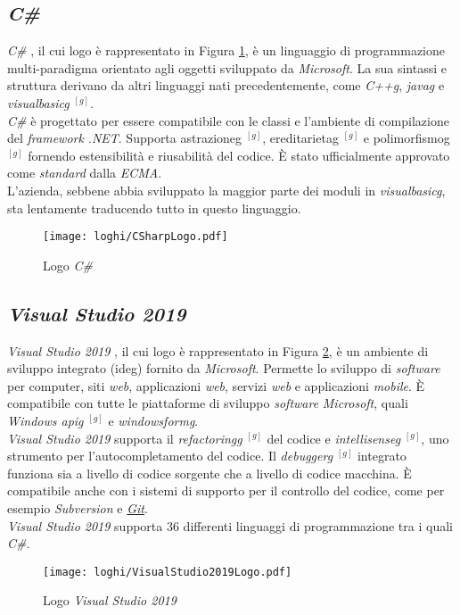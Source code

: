 \subsection*{\textit{C\#}}
\noindent \textit{C\#} \cite{siteI:csharp-docs}, il cui logo è rappresentato in Figura \ref{logoCSharp}, è un linguaggio di programmazione multi-paradigma orientato agli oggetti
sviluppato da \textit{Microsoft}. La sua sintassi e struttura derivano da altri linguaggi nati
precedentemente, come \textit{\gls{C++g}}, \textit{\gls{javag}} e \textit{\gls{visualbasicg}} $^{[g]}$.\\
\textit{C\#} è progettato per essere compatibile con le classi e l’ambiente di compilazione
del \textit{framework} \textit{.NET}. Supporta \gls{astrazioneg} $^{[g]}$, \gls{ereditarietag} $^{[g]}$ e \gls{polimorfismog} $^{[g]}$
fornendo estensibilità e riusabilità del codice.
È stato ufficialmente approvato come \textit{standard} dalla \textit{ECMA}.\\
L'azienda, sebbene abbia sviluppato la maggior parte dei moduli
in \textit{\gls{visualbasicg}}, sta lentamente traducendo tutto in questo linguaggio.
\begin{figure}[!h] 
    \centering 
    \texttt{[image: loghi/CSharpLogo.pdf]} 
    \caption{Logo \textit{C\#}}
    \label{logoCSharp}
 \end{figure}

\subsection*{\textit{Visual Studio 2019}}
\noindent \textit{Visual Studio 2019} \cite{siteN:vs-docs}, il cui logo è rappresentato in Figura \ref{logoVisualStudio}, è un ambiente di sviluppo integrato (\gls{ideg}) fornito da \textit{Microsoft}.
Permette lo sviluppo di \textit{software} per computer, siti \textit{web}, applicazioni \textit{web}, servizi \textit{web}
e applicazioni \textit{mobile}. È compatibile con tutte le piattaforme di sviluppo
\textit{software} \textit{Microsoft}, quali \textit{Windows \gls{apig}} $^{[g]}$ e \textit{\gls{windowsformg}}.\\
\textit{Visual Studio 2019} supporta il \textit{\gls{refactoringg}} $^{[g]}$ del codice e \textit{\gls{intellisenseg}} $^{[g]}$, uno strumento per
l’autocompletamento del codice. Il \textit{\gls{debuggerg}} $^{[g]}$ integrato funziona sia a
livello di codice sorgente che a livello di codice macchina. È compatibile anche con i sistemi di supporto per il controllo del codice,
come per esempio \textit{Subversion} e \textit{\hyperref[sec:git]{Git}}.\\
\textit{Visual Studio 2019} supporta 36 differenti linguaggi di 
programmazione tra i quali \textit{C\#}.
\begin{figure}[!h] 
    \centering 
    \texttt{[image: loghi/VisualStudio2019Logo.pdf]} 
    \caption{Logo \textit{Visual Studio 2019}}
    \label{logoVisualStudio}
 \end{figure}

